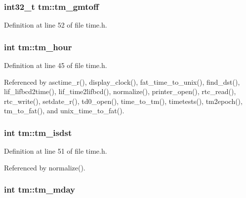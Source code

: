\subsubsection[{\texorpdfstring{tm\+\_\+gmtoff}{tm_gmtoff}}]{\setlength{\rightskip}{0pt plus 5cm}int32\+\_\+t tm\+::tm\+\_\+gmtoff}\hypertarget{structtm_a6b7d1fb16f21197ea027e364e2812c3d}{}\label{structtm_a6b7d1fb16f21197ea027e364e2812c3d}


Definition at line 52 of file time.\+h.

\subsubsection[{\texorpdfstring{tm\+\_\+hour}{tm_hour}}]{\setlength{\rightskip}{0pt plus 5cm}int tm\+::tm\+\_\+hour}\hypertarget{structtm_a3e7ca4e37f1abcaf56b8a916c38eb9fe}{}\label{structtm_a3e7ca4e37f1abcaf56b8a916c38eb9fe}


Definition at line 45 of file time.\+h.



Referenced by asctime\+\_\+r(), display\+\_\+clock(), fat\+\_\+time\+\_\+to\+\_\+unix(), find\+\_\+dst(), lif\+\_\+lifbcd2time(), lif\+\_\+time2lifbcd(), normalize(), printer\+\_\+open(), rtc\+\_\+read(), rtc\+\_\+write(), setdate\+\_\+r(), td0\+\_\+open(), time\+\_\+to\+\_\+tm(), timetests(), tm2epoch(), tm\+\_\+to\+\_\+fat(), and unix\+\_\+time\+\_\+to\+\_\+fat().

\subsubsection[{\texorpdfstring{tm\+\_\+isdst}{tm_isdst}}]{\setlength{\rightskip}{0pt plus 5cm}int tm\+::tm\+\_\+isdst}\hypertarget{structtm_a5645ca0580c8ab2c24f6c2965d9c9f9c}{}\label{structtm_a5645ca0580c8ab2c24f6c2965d9c9f9c}


Definition at line 51 of file time.\+h.



Referenced by normalize().

\subsubsection[{\texorpdfstring{tm\+\_\+mday}{tm_mday}}]{\setlength{\rightskip}{0pt plus 5cm}int tm\+::tm\+\_\+mday}\hypertarget{structtm_ab8d8904bad43b0c8b96e61941c5b5310}{}\label{structtm_ab8d8904bad43b0c8b96e61941c5b5310}


